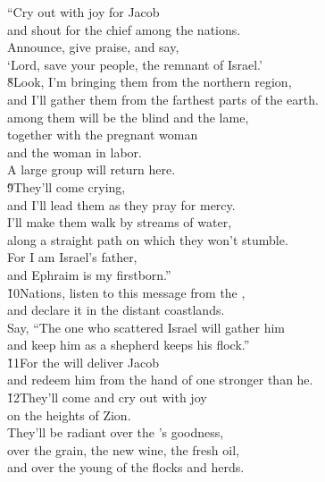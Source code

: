 \begin{poetry}
\poeml ``Cry out with joy for Jacob \\
\poemll    and shout for the chief among the nations. \\
\poeml Announce, give praise, and say, \\
\poemll    `Lord, save your people, the remnant of Israel.' \\
\poeml \v{8}Look, I'm bringing them from the northern region, \\
\poemll    and I'll gather them from the farthest parts of the earth. \\
\poeml among them will be the blind and the lame, \\
\poemll    together with the pregnant woman \\
\poemlll       and the woman in labor. \\
\poeml A large group will return here. \\
\poeml \v{9}They'll come crying, \\
\poemll    and I'll lead them as they pray for mercy. \\
\poeml I'll make them walk by streams of water, \\
\poemll    along a straight path on which they won't stumble. \\
\poeml For I am Israel's father, \\
\poemll    and Ephraim is my firstborn.'' \\
\poeml \v{10}Nations, listen to this message from the , \\
\poemll    and declare it in the distant coastlands. \\
\poeml Say, ``The one who scattered Israel will gather him \\
\poemll    and keep him as a shepherd keeps his flock.'' \\
\poeml \v{11}For the  will deliver Jacob \\
\poemll    and redeem him from the hand of one stronger than he. \\
\poeml \v{12}They'll come and cry out with joy \\
\poemll    on the heights of Zion. \\
\poeml They'll be radiant over the 's goodness, \\
\poemll    over the grain, the new wine, the fresh oil, \\
\poemlll       and over the young of the flocks and herds. \\

\end{poetry}
